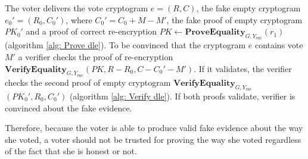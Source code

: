 
The voter delivers the vote cryptogram $e = (R, C)$, the fake empty cryptogram \( e_0' = (R_0, C_0') \), where \( C_0' = C_0 + M - M' \), the fake proof of empty cryptogram $PK_0'$ and a proof of correct re-encryption \( PK \leftarrow \mathbf{ProveEquality}_{G, Y_\mathrm{enc}} (r_1) \) (algorithm \ref{alg: Prove dle}). To be convinced that the cryptogram $e$ contains vote $M'$ a verifier checks the proof of re-encryption \( \mathbf{VerifyEquality}_{G, Y_\mathrm{enc}} (PK, R - R_0, C - C_0' - M') \). If it validates, the verifier checks the second proof of empty cryptogram \( \mathbf{VerifyEquality}_{G, Y_\mathrm{enc}} \) \( (PK_0', R_0, C_0') \) (algorithm \ref{alg: Verify dle}). If both proofs validate, verifier is convinced about the fake evidence.

Therefore, because the voter is able to produce valid fake evidence about the way she voted, a voter should not be trusted for proving the way she voted regardless of the fact that she is honest or not.